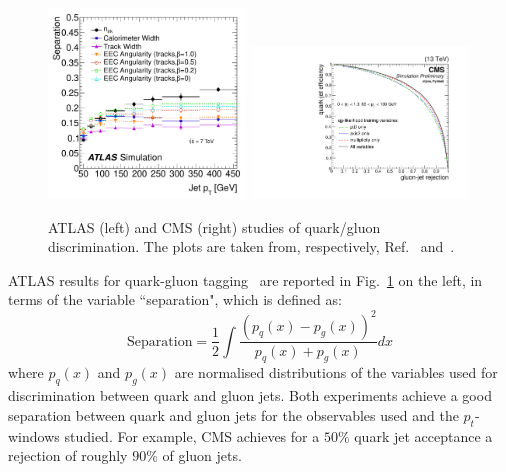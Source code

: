 \begin{figure}[t]
  \includegraphics[width=0.47\textwidth]{figures/gq_atlas.pdf}
 \includegraphics[width=0.51\textwidth]{figures/gq_cms.pdf}
  \caption{ATLAS (left) and CMS (right) studies of quark/gluon discrimination.
  The plots are taken from, respectively, Ref.~\cite{Aad:2014gea} and~\cite{CMS:2017wyc}. }\label{fig:exp_roc_qg}
\end{figure}

ATLAS results for quark-gluon tagging~\cite{Aad:2014gea, ATL-PHYS-PUB-2017-009} are reported in Fig.~\ref{fig:exp_roc_qg} on the left, in terms of the variable ``separation", which is defined as:
\begin{equation}
\mathrm{Separation} = \frac{1}{2} \int \frac{(p_q(x) - p_g(x))^2}{p_q(x) + p_g(x)} dx
\end{equation}
where $p_q(x)$ and $p_g(x)$ are normalised distributions of the variables used for discrimination between quark and gluon jets. 
%
Both experiments achieve a good separation between quark and gluon jets for the observables used and the $p_t$-windows studied. For example, CMS achieves for a $50\%$ quark jet acceptance a rejection of roughly $90\%$ of gluon jets.




